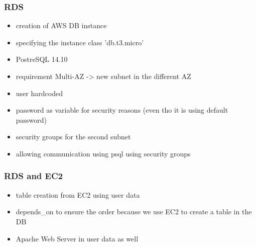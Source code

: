 \documentclass{beamer}
\begin{document}
	\begin{frame}
		\frametitle{RDS}
		\begin{itemize}
			\item creation of AWS DB instance
			\item specifying the instance class 'db.t3.micro'
			\item PostreSQL 14.10
			\item requirement Multi-AZ -> new subnet in the different AZ
			\item user hardcoded
			\item password as variable for security reasons (even tho it is using default password)
			\item security groups for the second subnet
			\item allowing communication using psql using security groups
		\end{itemize}
	\end{frame}

	\begin{frame}
		\frametitle{RDS and EC2}
		\begin{itemize}
			\item table creation from EC2 using user data
			\item depends\_on to ensure the order because we use EC2 to create a table in the DB
			\item Apache Web Server in user data as well
		\end{itemize}
	\end{frame}
	
\end{document}
